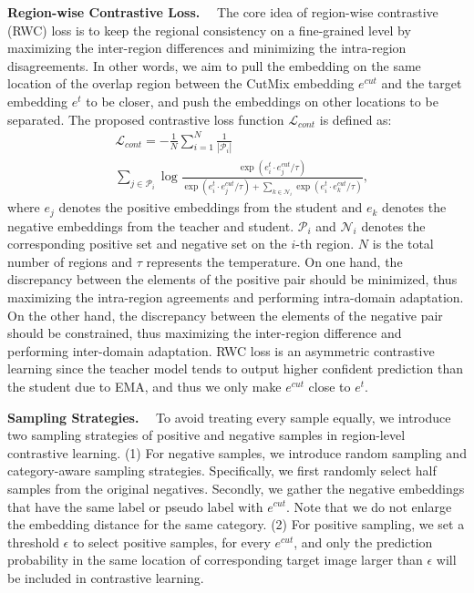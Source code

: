 \documentclass{article}
\renewcommand{\paragraph}[1]{\noindent\textbf{#1}~~}
\begin{document}
\paragraph{Region-wise Contrastive Loss.}
The core idea of region-wise contrastive (RWC) loss is to keep the regional consistency on a fine-grained level by maximizing the inter-region differences and minimizing the intra-region disagreements.  In other words, we aim to pull the embedding on the same location of the overlap region between the CutMix embedding  $e^{cut}$ and the target embedding $e^{t}$ to be closer, and push the embeddings on other locations to be separated.  The proposed contrastive loss function $\mathcal{L}_{cont}$ is defined as: 
\begin{equation}
\begin{aligned}
&\mathcal{L}_{cont}=-\frac{1}{N} \sum_{i=1}^{N} \frac{1}{\left|\mathcal{P}_{i}\right|} \\
&\sum_{j \in \mathcal{P}_{i}} \log \frac{\exp \left(e_{i}^{t} \cdot e^{cut}_{j} / \tau\right)}{\exp \left(e_{i}^{t} \cdot e^{cut}_{j} / \tau\right)+\sum_{k \in \mathcal{N}_{i}} \exp \left(e_{i}^{t} \cdot e^{cut}_{k} / \tau\right)},
\end{aligned}
\end{equation}
where $e_j$ 
denotes the positive embeddings from the student and $e_k$ denotes the negative embeddings from the teacher and student.
$\mathcal{P}_{i}$ and $\mathcal{N}_{i}$ denotes the corresponding positive set and negative set on the $i$-th region. $N$ is the total number of regions and $\tau$ represents the temperature. On one hand, the discrepancy between the elements of the positive pair should be minimized, thus maximizing the intra-region agreements and performing intra-domain adaptation. On the other hand, the discrepancy between the elements of the negative pair should be constrained, thus maximizing the inter-region difference and performing inter-domain adaptation. RWC loss is an asymmetric contrastive learning since the teacher model tends to output higher confident prediction than the student due to EMA, and thus we only make $e^{cut}$ close to $e^{t}$. 

\paragraph{Sampling Strategies.}
To avoid treating every sample equally, we introduce two sampling strategies of positive and negative samples in region-level contrastive learning.
(1) For negative samples, we introduce random sampling and category-aware sampling strategies. Specifically, we first randomly select half samples from the original negatives. Secondly, we gather the negative embeddings that have the same label or pseudo label with $e^{cut}$. Note that we do not enlarge the embedding distance for the same category.
(2) For positive sampling, we set a threshold $\epsilon$ to select positive samples, for every $e^{cut}$, and only the prediction probability in the same location of corresponding target image larger than $\epsilon$ will be included in contrastive learning.        
\end{document}
